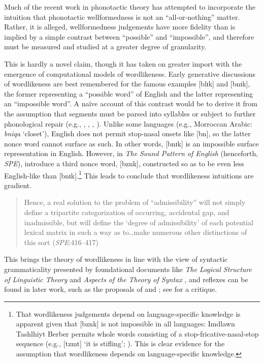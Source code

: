 \label{gradience}

Much of the recent work in phonotactic theory has attempted to incorporate the intuition that phonotactic wellformedness is not an ``all-or-nothing'' matter.
Rather, it is alleged, wellformedness judgements have more fidelity than is implied by a simple contrast between ``possible'' and ``impossible'', and therefore must be measured and studied at a greater degree of granularity.

This is hardly a novel claim, though it has taken on greater import with the emergence of computational models of wordlikeness.
Early generative discussions of wordlikeness \citep[e.g.,][]{Chomsky1965,Halle1962} are best remembered for the famous examples [blɪk] and [bnɪk], the former representing a ``possible word'' of English and the latter representing an ``impossible word''. 
A naïve account of this contrast would be to derive it from the assumption that segments must be parsed into syllables or subject to further phonological repair (e.g., \citealt[10f.]{Hooper1973}, \citealt[57f.]{Kahn1976}, \citealt{Ito1989a}, \citealt[19f.]{Wolf2009}).
Unlike some languages (e.g., Morroccan Arabic: \emph{bniqa} `closet'), English does not permit stop-nasal onsets like [bn], so the latter nonce word cannot surface as such.
In other words, [bnɪk] is an impossible surface representation in English.
However, in \emph{The Sound Pattern of English} (henceforth, \emph{SPE}), \citet{SPE} introduce a third nonce word, [bznk], constructed so as to be even less English-like than [bnɪk].\footnote{
    That wordlikeness judgements depend on language-specific knowledge is apparent given that [bznk] is not impossible in all languages: Imdlawn Tashlhiyt Berber permits whole words consisting of a stop-fricative-nasal-stop sequence (e.g., [tzmt] `it is stifling'; \citealt[112]{Dell1985}). 
    This is clear evidence for the assumption that wordlikeness depends on language-specific knowledge.}
This leads \citeauthor{SPE} to conclude that wordlikeness intuitions are gradient.

\begin{quote}
Hence, a real solution to the problem of ``admissibility'' will not simply define a tripartite categorization of occurring, accidental gap, and inadmissible, but will define the `degree of admissibility' of each potential lexical matrix in such a way as to\ldots{}make numerous other distinctions of this sort (\emph{SPE}:416--417)
\end{quote}

This brings the theory of wordlikeness in line with the view of syntactic grammaticality presented by foundational documents like \emph{The Logical Structure of Linguistic Theory} \citep{LSLT} and \emph{Aspects of the Theory of Syntax} \citep{ASPECTS}, and reflexes can be found in later work, such as the proposals of \citet{BARRIERS} and \citet{Huang1982}; see \citealt[43f.]{Schutze1996} for a critique.

